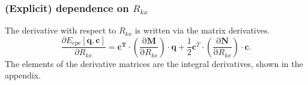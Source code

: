 \documentclass{article}
\numberwithin{equation}{section}
\begin{document}
\subsubsection{(Explicit) dependence on $R_{kx}$}
The derivative with respect to $R_{kx}$ is written via the matrix derivatives.
\begin{equation}
    \frac{\partial E_\mathrm{{cpe}}\left[\mathbf{q}, \mathbf{c}\right]}{\partial R_{kx}} = 
    \mathbf{c^T} \cdot \left( \frac{\mathrm{\partial}\mathbf{M}}{\mathrm{\partial}R_{kx}}\right) \cdot \mathbf{q} 
    + \frac{1}{2}\mathbf{c}^T \cdot \left( \frac{\mathrm{\partial}\mathbf{N}}{\mathrm{\partial}R_{kx}}\right) \cdot \mathbf{c}. 
\end{equation}
The elements of the derivative matrices are the integral derivatives, shown in the appendix.
\end{document}
